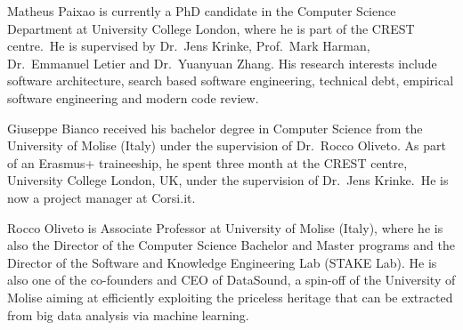 \documentclass[10pt,journal,compsoc]{IEEEtran}
\begin{document}
\begin{IEEEbiography}{Matheus Paixao}
is currently a PhD candidate in the Computer Science Department at University College London, where he is part of the CREST centre.~He is supervised by Dr.~Jens Krinke, Prof.~Mark Harman, Dr.~Emmanuel Letier and Dr.~Yuanyuan Zhang.
His research interests include software architecture, search based software engineering, technical debt, empirical software engineering and modern code review.
\end{IEEEbiography}

\begin{IEEEbiography}{Giuseppe Bianco}
  received his bachelor degree in Computer Science from the University
  of Molise (Italy) under the supervision of Dr.~Rocco Oliveto. As
  part of an Erasmus+ traineeship, he spent three month at the
  CREST centre, University College London, UK, under the supervision
  of Dr.~Jens Krinke.~He is now a project manager at Corsi.it.
\end{IEEEbiography}

\begin{IEEEbiography}{Rocco Oliveto}
is Associate Professor at University of Molise (Italy), where he is
also the Director of the Computer Science Bachelor and Master programs
and the Director of the Software and Knowledge Engineering Lab (STAKE
Lab).
He is also one of the co-founders and CEO of DataSound, a spin-off of the University of Molise aiming at efficiently exploiting the priceless heritage that can be extracted from big data analysis via machine learning. 
\end{IEEEbiography}
\vfill
\end{document}
